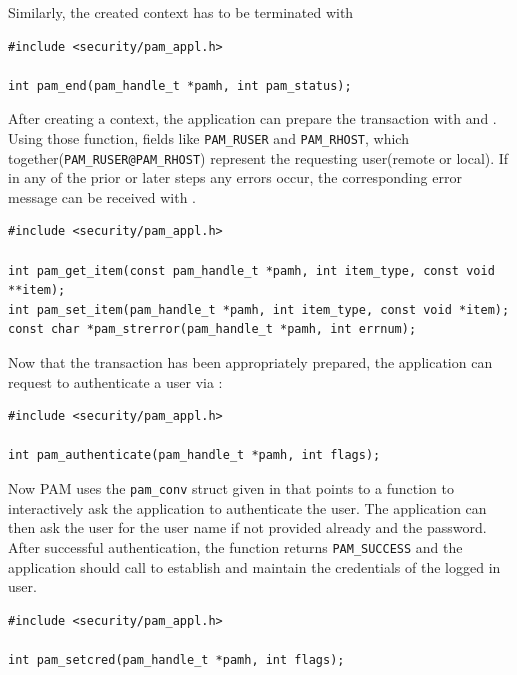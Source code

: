 \documentclass[10pt,a4paper,titlepage,twoside,english,final]{zhawreprt}
\begin{document}
Similarly, the created context has to be terminated with \cite{pam_end}
\setlistingC
\begin{lstlisting}[caption={Terminating a \gls{PAM} context},label=lst:TermPAMContext]
#include <security/pam_appl.h>

int pam_end(pam_handle_t *pamh, int pam_status);
\end{lstlisting}

After creating a context, the application can prepare the transaction with \cite{pam_set_item} and \cite{pam_get_item}. Using those function, fields like \texttt{PAM\_RUSER} and \texttt{PAM\_RHOST}, which together(\texttt{PAM\_RUSER@PAM\_RHOST}) represent the requesting user(remote or local). If in any of the prior or later steps any errors occur, the corresponding error message can be received with \cite{pam_strerror}.
\setlistingC
\begin{lstlisting}[caption={\gls{PAM} functions},label=lst:PAMFunctions]
#include <security/pam_appl.h>

int pam_get_item(const pam_handle_t *pamh, int item_type, const void **item);
int pam_set_item(pam_handle_t *pamh, int item_type, const void *item);
const char *pam_strerror(pam_handle_t *pamh, int errnum);
\end{lstlisting}

Now that the transaction has been appropriately prepared, the application can request to authenticate a user via \cite{pam_authenticate}:
\setlistingC
\begin{lstlisting}[caption={\gls{PAM} authentication},label=lst:PAMAuthentication]
#include <security/pam_appl.h>

int pam_authenticate(pam_handle_t *pamh, int flags);
\end{lstlisting}

Now \gls{PAM} uses the \texttt{pam\_conv} struct given in \cite{pam_start} that points to a function to interactively ask the application to authenticate the user. The application can then ask the user for the user name if not provided already and the password. After successful authentication, the function returns \texttt{PAM\_SUCCESS} and the application should call \cite{pam_setcred} to establish and maintain the credentials of the logged in user.
\setlistingC
\begin{lstlisting}[caption={\gls{PAM} credential setting},label=lst:PAMCredSet]
#include <security/pam_appl.h>

int pam_setcred(pam_handle_t *pamh, int flags);
\end{lstlisting}
\end{document}
